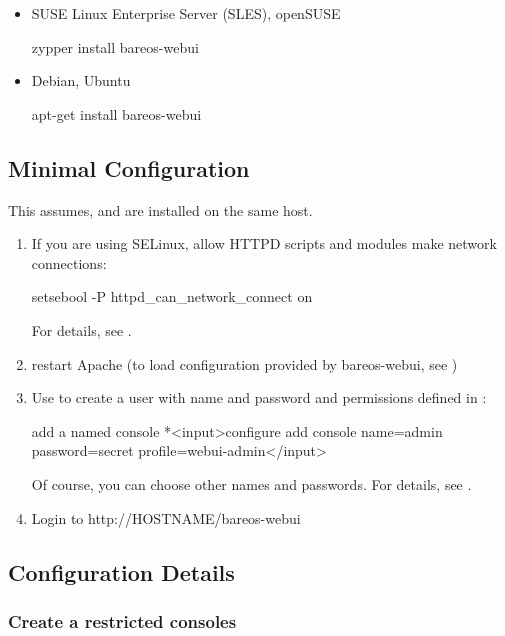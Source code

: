\begin{itemize}
 \item SUSE Linux Enterprise Server (SLES), openSUSE
\begin{commands}{}
zypper install bareos-webui
\end{commands}
\end{itemize}

\begin{itemize}
 \item Debian, Ubuntu
\begin{commands}{}
apt-get install bareos-webui
\end{commands}
\end{itemize}

\subsection{Minimal Configuration}

This assumes, \bareosDir and \bareosWebui are installed on the same host.

\begin{enumerate}
    \item If you are using SELinux, allow HTTPD scripts and modules make network connections:
\begin{commands}{}
setsebool -P httpd_can_network_connect on
\end{commands}
    For details, see .
    \item restart Apache (to load configuration provided by bareos-webui, see )
    \item Use  to create a user with name  and password  and permissions defined in :
\begin{bconsole}{add a named console}
*<input>configure add console name=admin password=secret profile=webui-admin</input>
\end{bconsole}
    Of course, you can choose other names and passwords.
    For details, see .
    \item Login to http://HOSTNAME/bareos-webui
\end{enumerate}


\subsection{Configuration Details}


\subsubsection{Create a restricted consoles}
    \label{sec:webui-console}

